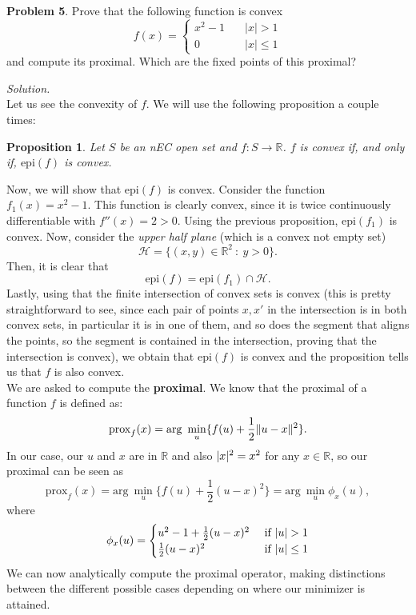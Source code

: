 \documentclass[a4paper]{article}
\DeclarePairedDelimiter\abs{\lvert}{\rvert}%
\DeclarePairedDelimiter\norm{\lVert}{\rVert}%
\newtheorem{nprop}{Proposition}
\newenvironment{problem}[2][Problem]
    { \begin{mdframed}[backgroundcolor=gray!20] \vspace*{0.1cm} \textbf{#1 #2}.}
    {  \end{mdframed}\vspace{0.3cm}}
\newenvironment{solution}
    {\textit{Solution.}\\}
    {}
\newcommand{\R}{\mathbb R}
\begin{document}
\begin{problem}{5}
Prove that the following function is convex
\[
  f(x) =
  \begin{cases}
    x^{2}-1 \quad & |x|>1      \\
    0  \quad      & |x| \leq 1
  \end{cases}
\]
and compute its proximal. Which are the fixed points of this proximal?
\end{problem}
\begin{solution}
  Let us see the convexity of \(f\). We will use the following proposition a couple times:
  \begin{nprop}
    Let \(S\) be an nEC open set and \(f:S\to \R\). \(f\) is convex if, and only if, \(\text{epi}(f)\) is convex.
  \end{nprop}

  Now, we will show that \(\text{epi}(f)\) is convex. Consider the function \(f_1(x) = x^2 - 1\). This function is clearly convex, since it is twice continuously differentiable with \(f''(x) = 2 > 0\). Using the previous proposition, \(\text{epi}(f_1)\) is convex. Now, consider the \emph{upper half plane} (which is a convex not empty set)
  \[
    \mathcal H = \{ (x,y) \in \R^2 \ : \ y > 0\}.
  \]
  Then, it is clear that
  \[
    \text{epi}(f) = \text{epi}(f_1) \cap \mathcal H.
  \]
  Lastly, using that the finite intersection of convex sets is convex (this is pretty straightforward to see, since each pair of points \(x,x'\) in the intersection is in both convex sets, in particular it is in one of them, and so does the segment that aligns the points, so the segment is contained in the intersection, proving that the intersection is convex), we obtain that \(\text{epi}(f)\) is convex and the proposition tells us that \(f\) is also convex.\\

  We are asked to compute the \textbf{proximal}. We know that the proximal of a function \(f\) is defined as:
  \[
    \text{prox}_f(x) = \text{arg}\ \min_u \{f(u) + \frac{1}{2} \norm{u-x}^2\}.
  \]
  In our case, our \(u\) and \(x\) are in \(\R\) and also \(\abs{x}^2 = x^2\) for any \(x\in \R\), so our proximal can be seen as
  \[
    \text{prox}_f(x) = \text{arg}\ \min_u \{f(u) + \frac{1}{2}(u-x)^2\} = \text{arg}\ \min_u \phi_x(u),
  \]
  where
  \begin{equation}\label{ej5:prox}
    \phi_x(u) =  \begin{cases}
      u^2 - 1 + \frac{1}{2}(u-x)^2 & \text{ if } \abs{u} > 1    \\
      \frac{1}{2}(u-x)^2           & \text{ if } \abs{u} \leq 1
    \end{cases}
  \end{equation}
  We can now analytically compute the proximal operator, making distinctions between the different possible cases depending on where our minimizer is attained.


\end{solution}
\end{document}
